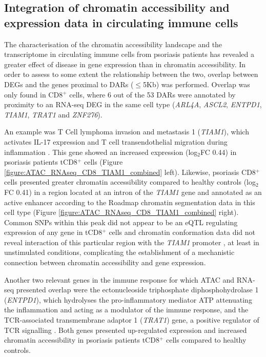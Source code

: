\subsection{Integration of chromatin accessibility and expression data in circulating immune cells}
The characterisation of the chromatin accessibility landscape and the transcriptome in circulating immune cells from psoriasis patients has revealed a greater effect of disease in gene expression than in chromatin accessibility. In order to assess to some extent the relationship between the two, overlap between DEGs and the genes proximal to DARs ($\leq$5Kb) was performed. Overlap was only found in CD8$^+$ cells, where 6 out of the 53 DARs were annotated by proximity to an RNA-seq DEG in the same cell type (\textit{ARL4A}, \textit{ASCL2}, \textit{ENTPD1}, \textit{TIAM1}, \textit{TRAT1} and \textit{ZNF276}). 

An example was T Cell lymphoma invasion and metastasis 1 (\textit{TIAM1}), which activates IL-17 expression and T cell transendothelial migration during inflammation \parencite{Kurdi2016, Gerard2009}. This gene showed an increased expression (log$_2$FC 0.44) in psoriasis patients tCD8$^+$ cells (Figure \ref{figure:ATAC_RNAseq_CD8_TIAM1_combined} left). Likewise, psoriasis CD8$^+$ cells presented greater chromatin accessibility compared to healthy controls (log$_2$FC 0.41) in a region located at an intron of the \textit{TIAM1} gene and annotated as an active enhancer according to the Roadmap chromatin segmentation data in this cell type (Figure \ref{figure:ATAC_RNAseq_CD8_TIAM1_combined} right). Common SNPs within this peak did not appear to be an eQTL regulating expression of any gene in tCD8$^+$ cells \parencite{Kasela2017} and chromatin conformation data did not reveal interaction of this particular region with the \textit{TIAM1} promoter \parencite{Javiere2016}, at least in unstimulated conditions, complicating the establishment of a mechanistic connection between chromatin accessibility and gene expression.

Another two relevant genes in the immune response for which ATAC and RNA-seq presented overlap were the ectonucleoside triphosphate diphosphohydrolase 1 (\textit{ENTPD1}), which hydrolyses the pro-inflammatory mediator ATP attenuating the inflammation and acting as a modulator of the immune response, and the TCR-associated transmembrane adaptor 1 (\textit{TRAT1}) gene, a positive regulator of TCR signalling \parencite{Antonioli2013, Valk2006}. Both genes presented up-regulated expression and increased chromatin accessibility in psoriasis patients tCD8$^+$ cells compared to healthy controls.

